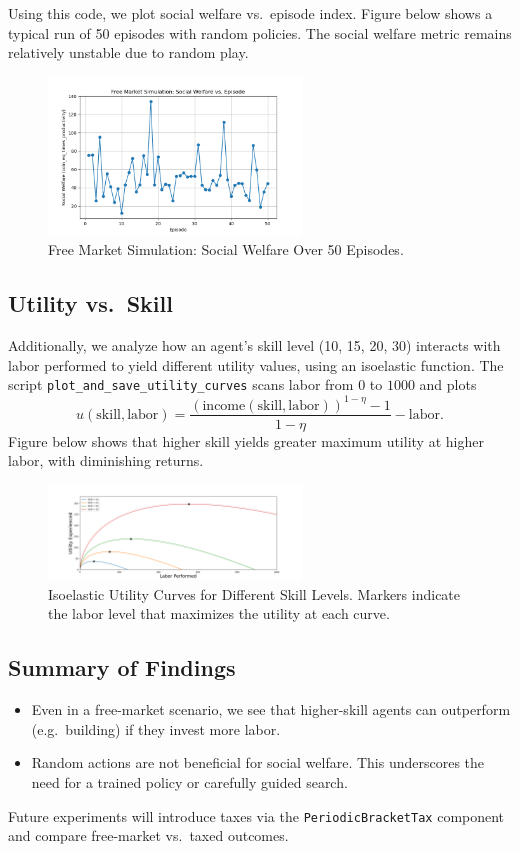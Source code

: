 Using this code, we plot social welfare vs.\ episode index. Figure below shows a typical run of 50 episodes with random policies. The social welfare metric remains relatively unstable due to random play.
\begin{figure}[H]
    \centering
    \includegraphics[width=0.6\textwidth]{fig/free_market_sw.png}
    \caption{Free Market Simulation: Social Welfare Over 50 Episodes.}
    \label{fig:free_market_sw}
\end{figure}

\subsection{Utility vs.\ Skill}

Additionally, we analyze how an agent’s skill level (10, 15, 20, 30) interacts with labor performed to yield different utility values, using an isoelastic function. The script \texttt{plot\_and\_save\_utility\_curves} scans labor from $0$ to $1000$ and plots
\[
u(\text{skill}, \text{labor}) = \frac{(\text{income}(\text{skill},\text{labor}))^{1-\eta}-1}{1-\eta} - \text{labor}.
\]
Figure below shows that higher skill yields greater maximum utility at higher labor, with diminishing returns.

\begin{figure}[H]
    \centering
    \includegraphics[width=0.6\textwidth]{fig/utility_curves_based_on_skill.png}
    \caption{Isoelastic Utility Curves for Different Skill Levels. Markers indicate the labor level that maximizes the utility at each curve.}
    \label{fig:skill_utility}
\end{figure}

\subsection{Summary of Findings}
\begin{itemize}
    \item Even in a free-market scenario, we see that higher-skill agents can outperform (e.g.\ building) if they invest more labor.
    \item Random actions are not beneficial for social welfare. This underscores the need for a trained policy or carefully guided search.
\end{itemize}
Future experiments will introduce taxes via the \texttt{PeriodicBracketTax} component and compare free-market vs.\ taxed outcomes.

